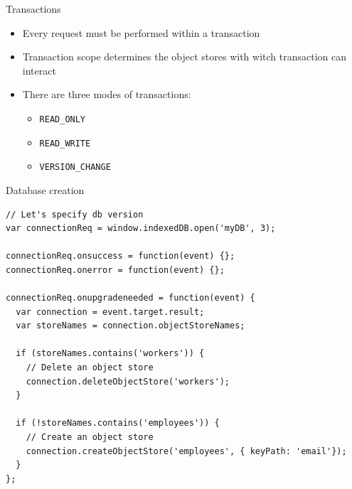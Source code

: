 \documentclass[xetex]{beamer}
\begin{document}
    \begin{frame}[containsverbatim]{Transactions}
      
      \begin{itemize}
        \item Every request must be performed within a transaction
        \item Transaction scope determines the object stores with witch transaction can interact
        \item There are three modes of transactions:
          \begin{itemize}
            \item \verb|READ_ONLY|
            \item \verb|READ_WRITE|
            \item \verb|VERSION_CHANGE|
          \end{itemize}
      \end{itemize}

      \begin{center}
      \end{center}


    \end{frame}

    \begin{frame}[containsverbatim]{Database creation}    
      \begin{lstlisting}
// Let's specify db version
var connectionReq = window.indexedDB.open('myDB', 3); 

connectionReq.onsuccess = function(event) {};
connectionReq.onerror = function(event) {};

connectionReq.onupgradeneeded = function(event) {
  var connection = event.target.result;  
  var storeNames = connection.objectStoreNames;

  if (storeNames.contains('workers')) {
    // Delete an object store
    connection.deleteObjectStore('workers');
  }

  if (!storeNames.contains('employees')) {
    // Create an object store
    connection.createObjectStore('employees', { keyPath: 'email'}); 
  }
};
      \end{lstlisting}
    \end{frame}
\end{document}
